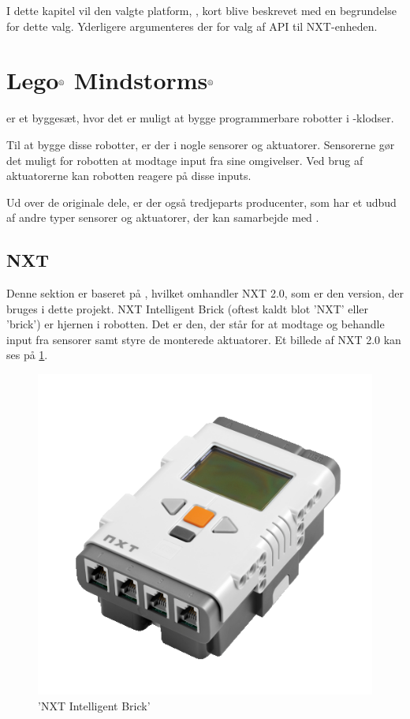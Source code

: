 I dette kapitel vil den valgte platform, \legoms, kort blive beskrevet med en begrundelse for dette valg.
Yderligere argumenteres der for valg af API til NXT-enheden.

\section{Lego$^{\textrm{\scriptsize\textregistered}}$ Mindstorms$^{\textrm{\scriptsize\textregistered}}$}\label{lego:mindstorms-nxt}
\legoms er et byggesæt, hvor det er muligt at bygge programmerbare robotter i \lego-klodser.

Til at bygge disse robotter, er der i \legoms nogle sensorer og aktuatorer. Sensorerne gør det muligt for robotten at modtage input fra sine omgivelser.
Ved brug af aktuatorerne kan robotten reagere på disse inputs.

Ud over de originale \lego dele, er der også tredjeparts producenter, som har et udbud af andre typer sensorer og aktuatorer, der kan samarbejde med \legoms.

\subsection{NXT}
Denne sektion er baseret på \cite{nxt}, hvilket omhandler NXT 2.0, som er den version, der bruges i dette projekt.
NXT Intelligent Brick (oftest kaldt blot 'NXT' eller 'brick') er hjernen i \legoms robotten.
Det er den, der står for at modtage og behandle input fra sensorer samt styre de monterede aktuatorer.
Et billede af NXT 2.0 kan ses på \cref{platform:nxt}.

\begin{figure}
\begin{center}
\includegraphics[scale=.5]{./graphics/nxt/brick}
\end{center}
\caption{'NXT Intelligent Brick'}
\label{platform:nxt}
\end{figure}

